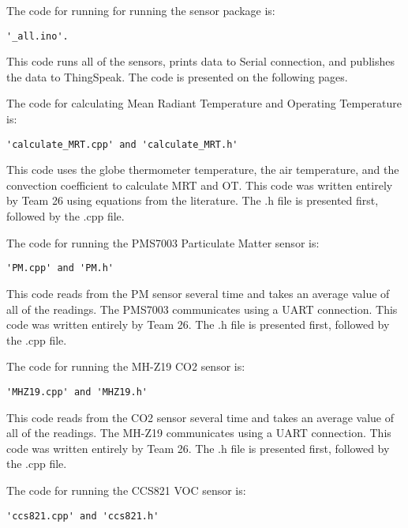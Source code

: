 \documentclass[12pt,letterpaper,titlepage]{article}
\begin{document}
\maketitle
The code for running for running the sensor package is:
\begin{verbatim}
'_all.ino'.
\end{verbatim}
This code runs all of the sensors, prints data to Serial connection, and publishes the data to ThingSpeak. The code is presented on the following pages.

The code for calculating Mean Radiant Temperature and Operating Temperature is:
\begin{verbatim}
'calculate_MRT.cpp' and 'calculate_MRT.h'
\end{verbatim}
This code uses the globe thermometer temperature, the air temperature, and the convection coefficient to calculate MRT and OT. This code was written entirely by Team 26 using equations from the literature. The .h file is presented first, followed by the .cpp file.


The code for running the PMS7003 Particulate Matter sensor is:
\begin{verbatim}
'PM.cpp' and 'PM.h'
\end{verbatim}
This code reads from the PM sensor several time and takes an average value of all of the readings. The PMS7003 communicates using a UART connection. This code was written entirely by Team 26. The .h file is presented first, followed by the .cpp file.


The code for running the MH-Z19 CO2 sensor is:
\begin{verbatim}
'MHZ19.cpp' and 'MHZ19.h'
\end{verbatim}
This code reads from the CO2 sensor several time and takes an average value of all of the readings. The MH-Z19 communicates using a UART connection. This code was written entirely by Team 26. The .h file is presented first, followed by the .cpp file.


The code for running the CCS821 VOC sensor is:
\begin{verbatim}
'ccs821.cpp' and 'ccs821.h'
\end{verbatim}
\end{document}

